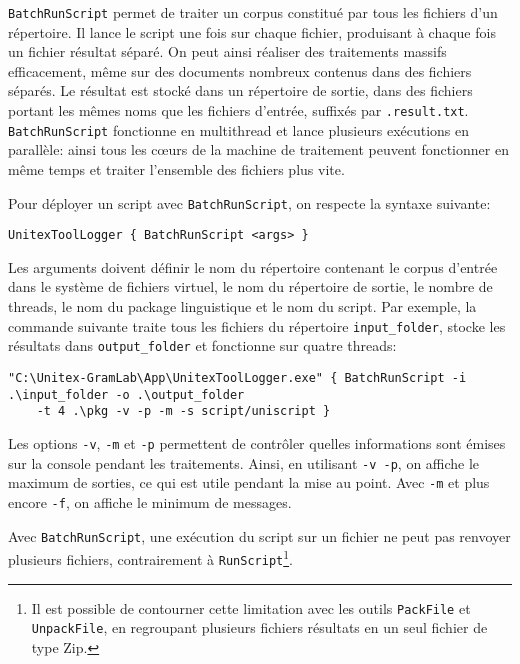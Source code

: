 \verb$BatchRunScript$ permet de traiter un corpus constitué par tous les fichiers d'un répertoire.
Il lance le script une fois sur chaque fichier, produisant à chaque fois un fichier résultat séparé.
On peut ainsi réaliser des traitements massifs efficacement, même sur des documents nombreux
contenus dans des fichiers séparés. Le résultat est stocké dans un répertoire de sortie, dans des
fichiers portant les mêmes noms que les fichiers d'entrée, suffixés par \verb$.result.txt$.
\verb$BatchRunScript$ fonctionne en multithread et lance plusieurs exécutions en parallèle: ainsi
tous les cœurs de la machine de traitement peuvent fonctionner en même temps et traiter
l’ensemble des fichiers plus vite.

\bigskip
\noindent Pour déployer un script avec \verb$BatchRunScript$, on respecte la syntaxe suivante:

\begin{verbatim}
UnitexToolLogger { BatchRunScript <args> }
\end{verbatim}

\noindent Les arguments doivent définir le nom du répertoire contenant le corpus d'entrée
dans le système de fichiers virtuel, le nom du répertoire de sortie, le nombre de threads, le nom
du package linguistique et le nom du script. Par exemple, la commande suivante traite tous les
fichiers du répertoire \verb$input_folder$, stocke les résultats dans \verb$output_folder$
et fonctionne sur quatre threads:

\begin{Verbatim}[fontsize=\small,fontfamily=helvetica]
"C:\Unitex-GramLab\App\UnitexToolLogger.exe" { BatchRunScript -i .\input_folder -o .\output_folder 
    -t 4 .\pkg -v -p -m -s script/uniscript }
\end{Verbatim}

\noindent Les options \verb$-v$, \verb$-m$ et \verb$-p$ permettent de contrôler quelles 
informations sont émises sur la console pendant les traitements. Ainsi, en utilisant \verb$-v -p$,
on affiche le maximum de sorties, ce qui est utile pendant la mise au point. Avec \verb$-m$
et plus encore \verb$-f$, on affiche le minimum de messages.

\bigskip
\noindent Avec \verb$BatchRunScript$, une exécution du script sur un fichier ne peut pas
renvoyer plusieurs fichiers, contrairement à \verb$RunScript$\footnote{Il est possible de
contourner cette limitation avec les outils \texttt{PackFile}  et \texttt{UnpackFile}, en
regroupant plusieurs fichiers résultats en un seul fichier de type Zip.}.



